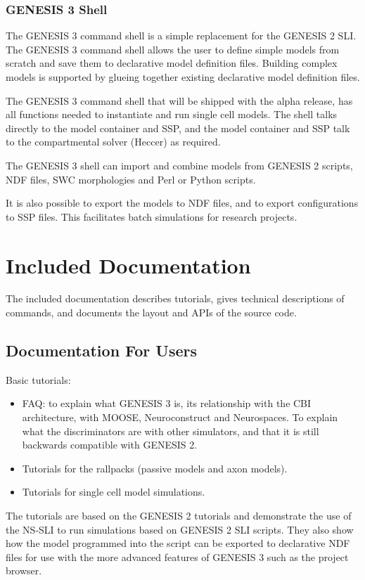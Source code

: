 \documentclass[12pt]{article}
\begin{document}
\subsubsection{GENESIS 3 Shell}

The GENESIS 3 command shell is a simple replacement for the GENESIS 2
SLI.  The GENESIS 3 command shell allows the user to define simple
models from scratch and save them to declarative model definition
files.  Building complex models is supported by glueing together
existing declarative model definition files.

The GENESIS 3 command shell that will be shipped with the alpha
release, has all functions needed to instantiate and run single cell
models.  The shell talks directly to the model container and SSP, and
the model container and SSP talk to the compartmental solver (Heccer)
as required.

The GENESIS 3 shell can import and combine models from GENESIS 2
scripts, NDF files, SWC morphologies and Perl or Python scripts.

It is also possible to export the models to NDF files, and to export
configurations to SSP files.  This facilitates batch simulations for
research projects.


\section{Included Documentation}

The included documentation describes tutorials, gives technical
descriptions of commands, and documents the layout and APIs of the
source code.


\subsection{Documentation For Users}
Basic tutorials:
\begin{itemize}
\item FAQ: to explain what GENESIS 3 is, its relationship with the CBI
  architecture, with MOOSE, Neuroconstruct and Neurospaces.  To
  explain what the discriminators are with other simulators, and that
  it is still backwards compatible with GENESIS 2.
\item Tutorials for the rallpacks (passive models and axon models).
\item Tutorials for single cell model simulations.
\end{itemize}

The tutorials are based on the GENESIS 2 tutorials and demonstrate the
use of the NS-SLI to run simulations based on GENESIS 2 SLI scripts.
They also show how the model programmed into the script can be
exported to declarative NDF files for use with the more advanced
features of GENESIS 3 such as the project browser.
\end{document}
